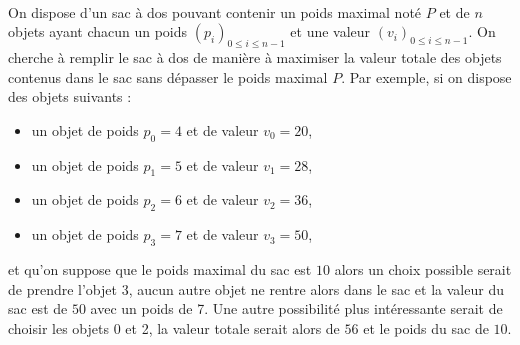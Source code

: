 \documentclass[11pt,a4paper]{article}
\begin{document}
\begin{Exercise}[title = {Permutation des éléments d'une liste}]
	\ifcorrige
	\fi
	\ifcorrige
	\fi
\end{Exercise}


\begin{Exercise}[title={Problème du sac à dos}]\\
	On dispose d'un sac à dos pouvant contenir un poids maximal noté $P$ et de $n$ objets ayant chacun un poids $\left(p_i\right)_{0\leqslant i \leqslant n-1}$ et une valeur $\left(v_i\right)_{0\leqslant i \leqslant n-1}$. On cherche à remplir le sac à dos de manière à maximiser la valeur totale des objets contenus dans le sac sans dépasser le poids maximal $P$.
	Par exemple, si on dispose des objets suivants :
	\begin{itemize}
		\item un objet de poids $p_0 = 4$ et de valeur $v_0 = 20$,
		\item un objet de poids $p_1 = 5$ et de valeur $v_1 = 28$,
		\item un objet de poids $p_2 = 6$ et de valeur $v_2 = 36$,
		\item un objet de poids $p_3 = 7$ et de valeur $v_3 = 50$,
	\end{itemize}
	et qu'on suppose que le poids maximal du sac est $10$ alors un choix possible serait de prendre l'objet 3, aucun autre objet ne rentre alors dans le sac et la valeur du sac est  de $50$ avec un poids de 7. Une autre possibilité plus intéressante serait de choisir les objets 0  et 2, la valeur totale serait alors de $56$ et le poids du sac de $10$.\smallskip


\end{Exercise}
\end{document}
